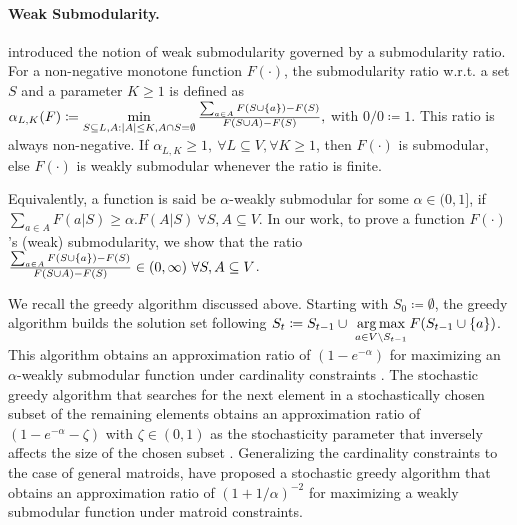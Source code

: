 \paragraph{Weak Submodularity.} \cite{DasKempe18} introduced the notion of weak submodularity governed by a submodularity ratio. For a non-negative monotone function $F(\cdot)$, the submodularity ratio w.r.t. a set $S$ and a parameter $K\geq 1$ is defined as $\alpha_{L, K}(F)\coloneqq \min\limits_{S\subseteq L, A:|A|\leq K, A\cap S=\emptyset}\frac{\sum_{a\in A}F(S\cup \{a\})-F(S)}{F(S\cup A)-F(S)},$ with $0/0\coloneqq 1$. This ratio is always non-negative. If $\alpha_{L, K}\geq 1, \ \forall L\subseteq V, \forall K\ge 1$, then $F(\cdot)$ is submodular, else $F(\cdot)$ is weakly submodular whenever the ratio is finite. 

Equivalently, a function is said be $\alpha$-weakly submodular for some $\alpha\in (0, 1]$, if $\sum_{a\in A}F(a|S)\geq \alpha. F(A|S)\ \forall S, A\subseteq V$. In our work, to prove a function $F(\cdot)$'s (weak) submodularity, we show that the ratio $\frac{\sum_{a\in A}F(S\cup \{a\})-F(S)}{F(S\cup A)-F(S)}\in (0, \infty)\ \forall S, A\subseteq V$.

We recall the greedy algorithm discussed above. Starting with $S_0\coloneqq \emptyset$, the greedy algorithm builds the solution set following $S_t \coloneqq  S_{t-1}\cup \ \mathop{\rm arg\,max}\limits_{a\in V\setminus S_{t-1}} F(S_{t-1}\cup \{a\})$.
This algorithm obtains an approximation ratio of $(1-e^{-\alpha})$ for maximizing an $\alpha$-weakly submodular function under cardinality constraints \citep{DasKempe18}. The stochastic greedy algorithm that searches for the next element in a stochastically chosen subset of the remaining elements obtains an approximation ratio of $(1-e^{-\alpha}-\zeta)$ with $\zeta\in (0, 1)$ as the stochasticity parameter that inversely affects the size of the chosen subset \citep{Khanna2017ScalableGF}. Generalizing the cardinality constraints to the case of general matroids, \cite{pmlr-v80-chen18b} have proposed a stochastic greedy algorithm that obtains an approximation ratio of $(1+1/\alpha)^{-2}$ for maximizing a weakly submodular function under matroid constraints.
